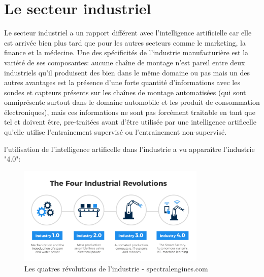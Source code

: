     \section{Le secteur industriel}
        Le secteur industriel a un rapport différent avec l'intelligence artificielle car elle est arrivée 
        bien plus tard que pour les autres secteurs comme le marketing, la finance et la médecine.
        Une des spécificités de l'industrie manufacturière est la variété de ses composantes: 
        aucune chaîne de montage n'est pareil entre deux industriels qu'il produisent des bien 
        dans le même domaine ou pas mais un des autres avantages est la présence d'une forte quantité 
        d'informations avec les sondes et capteurs présents sur les chaînes de montage automatisées 
        (qui sont omniprésente surtout dans le domaine automobile et les produit de consommation électroniques), 
        mais ces informations ne sont pas forcément traitable en tant que tel et doivent être, pre-traitées
        avant d'être utilisée par une intelligence artificelle qu'elle utilise l'entrainement 
        supervisé ou l'entrainement non-supervisé. \newline

        l'utilisation de l'intelligence artificelle dans l'industrie a vu apparaître 
        l'industrie "4.0":

        \begin{figure}[H]
            \centering
            \includegraphics[width=0.8\textwidth]{Images/industryfour}
            \caption{Les quatres révolutions de l'industrie - spectralengines.com}
            \label{fig:fourindustrialrevolutions}
        \end{figure}


